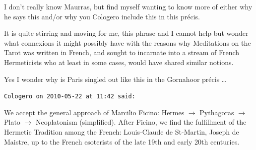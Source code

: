 \begin{footnotesize}
\begin{sffamily}
I don't really know Maurras, but find myself wanting to know more of either why he says this and/or why you Cologero include this in this précis.

It is quite stirring and moving for me, this phrase and I cannot help but wonder what connexions it might possibly have with the reasons why Meditations on the Tarot was written in French, and sought to incarnate into a stream of French Hermeticists who at least in some cases, would have shared similar notions.

Yes I wonder why is Paris singled out like this in the Gornahoor précis …


\hfill

\texttt{Cologero on 2010-05-22 at 11:42 said: }

We accept the general approach of Marcilio Ficino: Hermes $\rightarrow$ Pythagoras $\rightarrow$ Plato $\rightarrow$ Neoplatonism (simplified). After Ficino, we find the fulfillment of the Hermetic Tradition among the French: Louis-Claude de St-Martin, Joseph de Maistre, up to the French esoterists of the late 19th and early 20th centuries.


\end{sffamily}\end{footnotesize}

